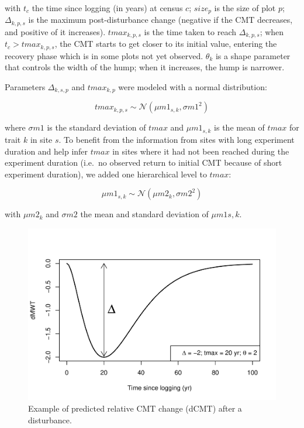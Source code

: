\documentclass[]{elsarticle} %
\makeatletter
\def\maxwidth{\ifdim\Gin@nat@width>\linewidth\linewidth
\else\Gin@nat@width\fi}
\let\Oldincludegraphics\includegraphics
\renewcommand{\includegraphics}[1]{\Oldincludegraphics[width=\maxwidth]{#1}}
\makeatother
\begin{document}
with \(t_c\) the time since logging (in years) at census \(c\);
\(size_p\) is the size of plot \(p\); \(\Delta_{k,p,s}\) is the maximum
post-disturbance change (negative if the CMT decreases, and positive of
it increases). \(tmax_{k,p,s}\) is the time taken to reach
\(\Delta_{k,p,s}\); when \(t_c > tmax_{k,p,s}\), the CMT starts to get
closer to its initial value, entering the recovery phase which is in
some plots not yet observed. \(\theta_k\) is a shape parameter that
controls the width of the hump; when it increases, the hump is narrower.

Parameters \(\Delta_{k,s,p}\) and \(tmax_{k,p}\) were modeled with a
normal distribution:

\begin{equation}
tmax_{k,p,s} \sim \mathcal{N} (\mu m1_{s,k}, \sigma m1^2)
\end{equation}

where \(\sigma m1\) is the standard deviation of \(tmax\) and
\(\mu m1_{s,k}\) is the mean of \(tmax\) for trait \(k\) in site \(s\).
To benefit from the information from sites with long experiment duration
and help infer \(tmax\) in sites where it had not been reached during
the experiment duration (i.e.~no observed return to initial CMT because
of short experiment duration), we added one hierarchical level to
\(tmax\):

\begin{equation}
\mu m1_{s,k} \sim \mathcal{N} (\mu m2_{k}, \sigma m2^2)
\end{equation}

with \(\mu m2_{k}\) and \(\sigma m2\) the mean and standard deviation of
\(\mu m1{s,k}\).

\begin{figure}
\centering
\includegraphics{rticle_tmfo_functional_files/figure-latex/method_example-1.pdf}
\caption{Example of predicted relative CMT change (dCMT) after a
disturbance.}
\end{figure}
\end{document}
